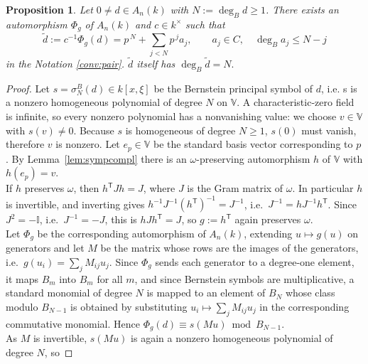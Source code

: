 \documentclass[pdflatex,sn-mathphys-num]{sn-jnl}
\numberwithin{equation}{section}
\theoremstyle{thmstyleone}
\newtheorem{proposition}[theorem]{Proposition}
\theoremstyle{thmstyletwo}
\begin{document}

\begin{proposition}\label{prop:monic}
Let $0\neq d\in A_n(k)$ with $N:=\deg_B d\ge1$. There exists an automorphism $\Phi_g$ of $A_n(k)$ and
$c\in k^{\times}$ such that
\begin{equation}
  \tilde d:=c^{-1}\Phi_g(d)=p^{\,N}+\sum_{j<N}p^{\,j}a_j, 
  \qquad a_j\in C,\quad \deg_B a_j\le N-j\label{eq:monic-d}
\end{equation}
in the Notation \ref{conv:pair}. $\tilde d$ itself has $\deg_B \tilde d = N.$
\end{proposition}

\begin{proof}
Let $s = \sigma_N^B(d)\in k[x,\xi]$ be the Bernstein principal symbol of $d$, i.e. s is a nonzero
homogeneous polynomial of degree $N$ on $\mathbb V$. A characteristic-zero field is
infinite, so every nonzero polynomial has a nonvanishing value: we choose $v\in \mathbb V$
with $s(v)\neq0$. Because $s$ is homogeneous of degree $N\geq 1$, $s(0)$ must vanish, therefore $v$ is nonzero. 
Let $e_p\in\mathbb V$ be the standard basis vector corresponding to $p$.
By Lemma~\ref{lem:sympcompl} there is an $\omega$-preserving automorphism
$h$ of $\mathbb V$ with $h(e_p)=v$.\\
If $h$ preserves $\omega$, then $h^{\mathsf T}Jh=J$, where $J$ is the Gram matrix
of $\omega$. In particular $h$ is invertible, and inverting gives
$h^{-1}J^{-1}(h^{\mathsf T})^{-1}=J^{-1}$, i.e.\ $J^{-1}=hJ^{-1}h^{\mathsf T}$.
Since $J^2=-\mathbb{I}$, i.e.\ $J^{-1}=-J$, this is $hJh^{\mathsf T}=J$, so
$g:=h^{\mathsf T}$  again preserves $\omega$. \\
Let $\Phi_g$ be the corresponding automorphism of $A_n(k)$, extending $u\mapsto g(u)$ on
generators and let $M$ be the matrix whose rows are the images of the generators, i.e.\
$g(u_i)=\sum_j M_{ij}u_j$. Since $\Phi_g$ sends each generator to a
degree-one element, it maps $B_m$ into $B_m$ for all $m$, and since
Bernstein symbols are multiplicative, a standard monomial of degree $N$ is
mapped to an element of $B_N$ whose class modulo $B_{N-1}$ is obtained by
substituting $u_i\mapsto\sum_j M_{ij}u_j$ in the corresponding commutative
monomial. Hence $\Phi_g(d)\equiv s(Mu)\bmod B_{N-1}$. \\
As $M$ is invertible,
$s(Mu)$ is again a nonzero homogeneous polynomial of degree $N$, so

\end{proof}
\end{document}
